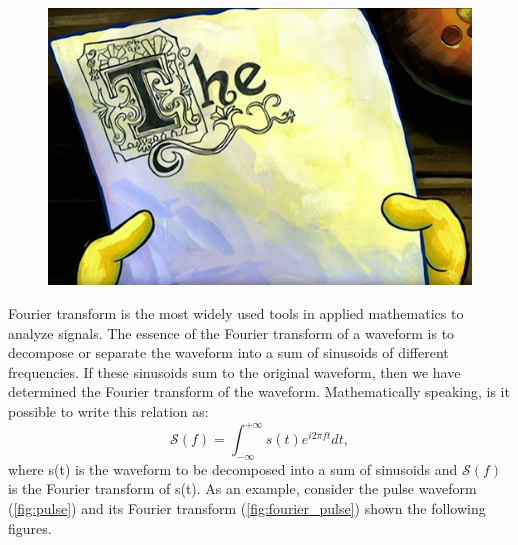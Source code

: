 \documentclass[a4paper,12pt]{article}
\begin{document}
\begin{figure} %
    \includegraphics[width=\linewidth]{THE.png}
    \vspace{-25pt}
\end{figure}
 Fourier transform is the most widely used tools in applied mathematics
to analyze signals. The essence of the Fourier transform of a waveform is to decompose
or separate the waveform into a sum of sinusoids of different frequencies.
If these sinusoids sum to the original waveform, then we have determined
the Fourier transform of the waveform.
Mathematically speaking, is it possible to write this relation as:
$$
\mathcal{S}(f) = \int_{-\infty}^{+\infty} s(t) e^{i2\pi f t} dt,
$$
where s(t) is the waveform to be decomposed into a sum of sinusoids
and $\mathcal{S}(f)$ is the Fourier transform of s(t).
As an example, consider the
pulse waveform (\ref{fig:pulse}) and its Fourier transform (\ref{fig:fourier_pulse}) shown the following figures.
\end{document}
